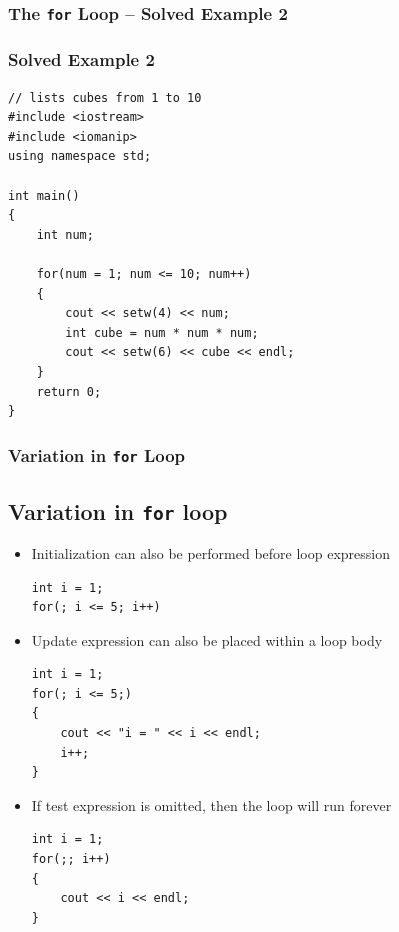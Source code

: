 \documentclass{beamer}
\begin{document}
\begin{frame} [fragile]
    \frametitle{The \texttt{for} Loop -- Solved Example 2}
    \subsubsection{Solved Example 2} %
    \label{ssub:solved_example_2}
    \lstset{style=mystyle}
    \begin{lstlisting}
// lists cubes from 1 to 10
#include <iostream>
#include <iomanip>
using namespace std;

int main()
{
    int num;

    for(num = 1; num <= 10; num++)
    {
        cout << setw(4) << num;
        int cube = num * num * num;
        cout << setw(6) << cube << endl;
    }
    return 0;
}
\end{lstlisting}
\end{frame}

\begin{frame}[fragile]
    \frametitle{Variation in \texttt{for} Loop}
    \subsection{Variation in \texttt{for} loop} %
    \label{sub:for_variation}
    \begin{itemize}
        \item Initialization can also be performed before loop expression
        \lstset{style=mystyle}
\begin{lstlisting}
int i = 1;
for(; i <= 5; i++)
\end{lstlisting}
        \item Update expression can also be placed within a loop body
        \lstset{style=mystyle}
\begin{lstlisting}
int i = 1;
for(; i <= 5;)
{
    cout << "i = " << i << endl;
    i++;
}
\end{lstlisting}
        \item If test expression is omitted, then the loop will run forever
        \lstset{style=mystyle}
\begin{lstlisting}
int i = 1;
for(;; i++)
{
    cout << i << endl;
}
\end{lstlisting}
    \end{itemize}

\end{frame}
\end{document}

